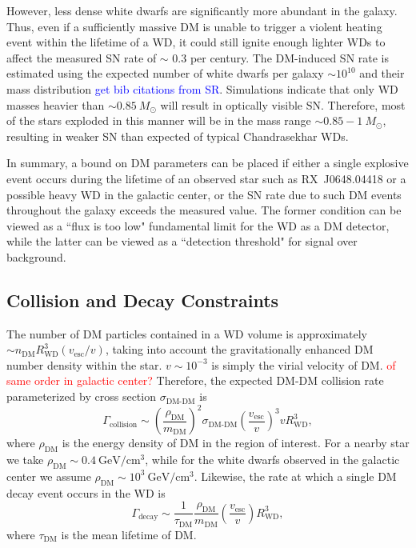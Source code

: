 \documentclass[twocolumn,showpacs,preprintnumbers,amsmath,amssymb,prd]{revtex4}
\newcommand{\GeV}{\text{GeV}}
\def\r{\right)}
\def\l{\left(}
\begin{document}
However, less dense white dwarfs are significantly more abundant in the galaxy.
Thus, even if a sufficiently massive DM is unable to trigger a violent heating event within the lifetime of a WD, it could still ignite enough lighter WDs to affect the measured SN rate of $\sim $ 0.3 per century.
The DM-induced SN rate is estimated using the expected number of white dwarfs per galaxy $\sim 10^{10}$ and their mass distribution \textcolor{blue}{get bib citations from SR}.
Simulations indicate that only WD masses heavier than $\sim 0.85 ~M_{\odot}$ will result in optically visible SN.
Therefore, most of the stars exploded in this manner will be in the mass range $\sim 0.85 - 1 ~M_{\odot}$, resulting in weaker SN than expected of typical Chandrasekhar WDs.


In summary, a bound on DM parameters can be placed if either a single explosive event occurs during the lifetime of an observed star such as RX~J0648.04418 or a possible heavy WD in the galactic center, or the SN rate due to such DM events throughout the galaxy exceeds the measured value.
The former condition can be viewed as a ``flux is too low" fundamental limit for the WD as a DM detector, while the latter can be viewed as a ``detection threshold" for signal over background.


\subsection{Collision and Decay Constraints}
\label{sec:CollisionConstraints}
The number of DM particles contained in a WD volume is approximately $\sim n_\text{DM} R_\text{WD}^3 (v_\text{esc}/v)$, taking into account the gravitationally enhanced DM number density within the star.
$v \sim 10^{-3}$ is simply the virial velocity of DM.
\textcolor{red}{of same order in galactic center?} Therefore, the expected DM-DM collision rate parameterized by cross section $\sigma_\text{DM-DM}$ is 
\begin{equation}
\Gamma_\text{collision} \sim \l \frac{\rho_{\text{DM}}}{m_\text{DM}} \r^2 \sigma_\text{DM-DM} \l \frac{v_\text{esc}}{v}\r^3 v R_\text{WD}^3,
\end{equation}
where $\rho_{\text{DM}}$ is the energy density of DM in the region of interest.
For a nearby star we take $\rho_\text{DM} \sim 0.4 ~\GeV/\text{cm}^3$, while for the white dwarfs observed in the galactic center we assume $\rho_\text{DM} \sim 10^3 ~\text{GeV}/\text{cm}^3$.
Likewise, the rate at which a single DM decay event occurs in the WD is
\begin{equation}
\Gamma_\text{decay} \sim  \frac{1}{\tau_\text{DM}} \frac{\rho_{\text{DM}}}{m_\text{DM}} \l \frac{v_\text{esc}}{v} \r R_\text{WD}^3,
\end{equation}
where $\tau_\text{DM}$ is the mean lifetime of DM.
\end{document}
